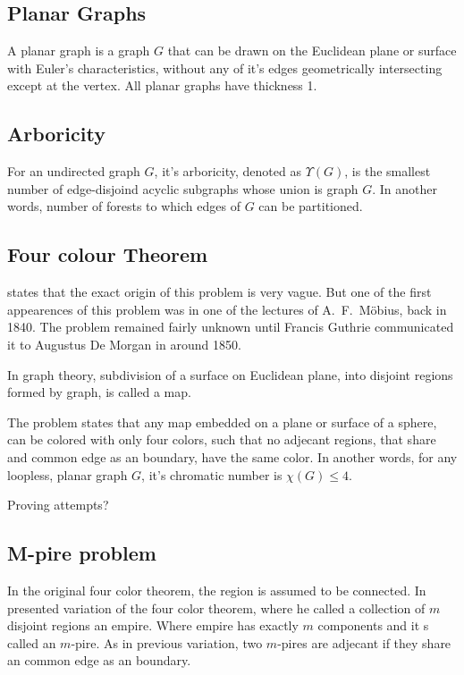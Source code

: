 \subsection{Planar Graphs}

A planar graph is a graph $G$ that can be drawn on the Euclidean plane or surface with Euler's characteristics, without any of it's edges geometrically intersecting except at the vertex. All planar graphs have thickness 1.

\subsection{Arboricity}

For an undirected graph $G$, it's arboricity, denoted as $\Upsilon(G)$, is the smallest number of edge-disjoind acyclic subgraphs whose union is graph $G$. In another words, number of forests to which edges of $G$ can be partitioned.

\subsection{Four colour Theorem}

\textcite{may1965originOf4} states that the exact origin of this problem is very vague. But one of the first appearences of this problem was in one of the lectures of A.~F.~Möbius, back in 1840. The problem remained fairly unknown until Francis Guthrie communicated it to Augustus De Morgan in around 1850.

In graph theory, subdivision of a surface on Euclidean plane, into disjoint regions formed by graph, is called a map.

The problem states that any map embedded on a plane or surface of a sphere, can be colored with only four colors, such that no adjecant regions, that share and common edge as an boundary, have the same color. In another words, for any loopless, planar graph $G$, it's chromatic number is $\chi(G) \leq 4$. \parencite{Appel1978fourColorTheorem}

Proving attempts?

\subsection{M-pire problem}

In the original four color theorem, the region is assumed to be connected. In \textcite{Heawood1947mapColourProblem} presented variation of the four color theorem, where he called a collection of $m$ disjoint regions an empire. Where empire has exactly $m$ components and it s called an $m$-pire. As in previous variation, two $m$-pires are adjecant if they share an common edge as an boundary. \parencite{jackson1985heawood}

